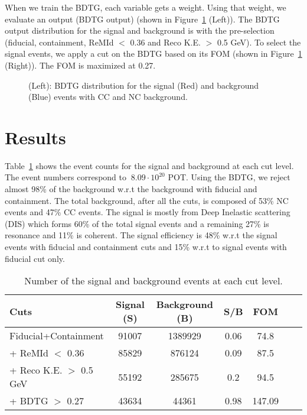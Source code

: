 \documentclass[12pt]{article}
\begin{document}
When we train the BDTG, each variable gets a weight. Using that weight, we evaluate an output (BDTG output) (shown in Figure~\ref{fig:bdtg} (Left)). The BDTG output distribution for the signal and background is with the pre-selection (fiducial, containment, ReMId $<$ 0.36 and Reco K.E. $>$ 0.5 GeV). To select the signal events, we apply a cut on the BDTG based on its FOM (shown in Figure~\ref{fig:bdtg} (Right)). The FOM is maximized at 0.27.

\begin{figure}[htb]
\begin{center}
\caption{(Left): BDTG distribution for the signal (Red) and background (Blue) events with CC and NC background.}
\label{fig:bdtg}
\end{center}
\end{figure}


\section{Results}

Table~\ref{tab:eventcount} shows the event counts for the signal and background at each cut level. The event numbers correspond to  $~8.09\cdot10^{20}$ POT. Using the BDTG, we reject almost 98\% of the background w.r.t the background with fiducial and containment. The total background, after all the cuts, is composed of 53\% NC events and 47\% CC events. The signal is mostly from Deep Inelastic scattering (DIS) which forms 60\% of the total signal events and a remaining 27\% is resonance and 11\% is coherent. The signal efficiency  is 48\% w.r.t the signal events with fiducial and containment cuts and 15\% w.r.t to signal events with fiducial cut only. 

\begin{table}[b]
\begin{center}
\begin{tabular}{l|cccccc}  
Cuts &  Signal (S) & Background (B)  &  
S/B & FOM  \\ \hline 

 Fiducial+Containment  &   91007     &     1389929      &     0.06  &  74.8   \\
 + ReMId $<$ 0.36 &  85829     &     876124      &  0.09 & 87.5 \\ 
  + Reco K.E. $>$ 0.5 GeV &  55192     &   285675      &  0.2 & 94.5 \\ 
  + BDTG $>$ 0.27  &  43634     &   44361      &  0.98 & 147.09 \\ \hline
\end{tabular}
\caption{Number of the signal and background events at each cut level.}
\label{tab:eventcount}
\end{center}
\end{table}
\end{document}
